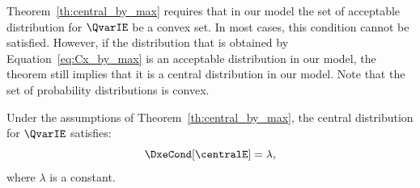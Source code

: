 Theorem~\ref{th:central_by_max} requires that in our model the set of acceptable distribution for $\QvarIE$ be a convex
set.
In most cases, this condition cannot be satisfied.
However, if the distribution that is obtained by Equation~\ref{eq:Cx_by_max} is an acceptable distribution in our model,
the theorem still implies that it is a central distribution in our model.
Note that the set of probability distributions is convex.

\begin{theorem}
    \label{th:lambda}
    Under the assumptions of Theorem~\ref{th:central_by_max}, the central distribution for $\QvarIE$ satisfies:
    \begin{equation}
        \DxeCond[\centralE] = \lambda,
        \label{eq:lambda}
    \end{equation}
    where $\lambda$ is a constant.
\end{theorem}
